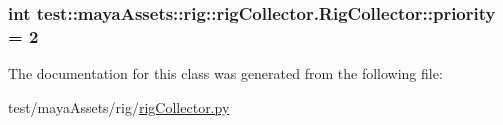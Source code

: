 \hypertarget{classtest_1_1mayaAssets_1_1rig_1_1rigCollector_1_1RigCollector_a910bb57f3d792bafcf5b8fb8880d8fe7}{
\subsubsection[{priority}]{\setlength{\rightskip}{0pt plus 5cm}int {\bf test\-::maya\-Assets\-::rig\-::rig\-Collector.\-Rig\-Collector\-::priority} = 2}}\label{d2/d7d/classtest_1_1mayaAssets_1_1rig_1_1rigCollector_1_1RigCollector_a910bb57f3d792bafcf5b8fb8880d8fe7}


\-The documentation for this class was generated from the following file\-:\begin{DoxyCompactItemize}
\item 
test/maya\-Assets/rig/\hyperlink{rigCollector_8py}{rig\-Collector.\-py}\end{DoxyCompactItemize}
